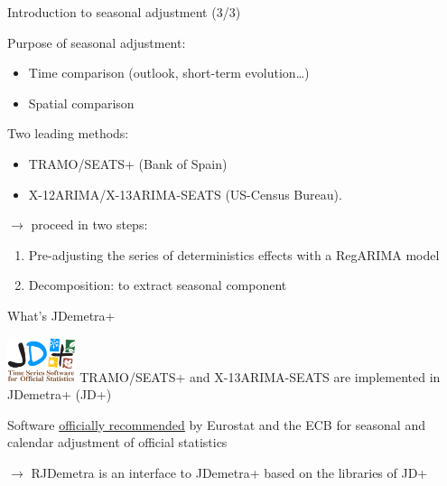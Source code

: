 \documentclass[10pt,xcolor=table,color={dvipsnames,usenames},ignorenonframetext,usepdftitle=false,french]{beamer}
\providecommand{\tightlist}{%
  \setlength{\parskip}{0pt}
  }
\begin{document}
\begin{frame}{Introduction to seasonal adjustment (3/3)}
\protect\hypertarget{introduction-to-seasonal-adjustment-33}{}

Purpose of seasonal adjustment:

\begin{itemize}
\tightlist
\item
  Time comparison (outlook, short-term evolution\ldots{})\\
\item
  Spatial comparison
\end{itemize}

\bigskip
\pause

Two leading methods:

\begin{itemize}
\tightlist
\item
  TRAMO/SEATS+ (Bank of Spain)\\
\item
  X-12ARIMA/X-13ARIMA-SEATS (US-Census Bureau).
\end{itemize}

\bigskip
\pause

\(\rightarrow\) proceed in two steps:

\begin{enumerate}
\item
  Pre-adjusting the series of deterministics effects with a RegARIMA
  model
\item
  Decomposition: to extract seasonal component
\end{enumerate}

\end{frame}

\begin{frame}{What's JDemetra+\bcquestion }
\protect\hypertarget{whats-jdemetra}{}

\includegraphics[width=2cm]{img/jdemetra+.png} TRAMO/SEATS+ and
X-13ARIMA-SEATS are implemented in JDemetra+ (JD+)

\bigskip

\large\faThumbsUp{} \normalsize Software
\href{https://ec.europa.eu/eurostat/cros/system/files/Jdemetra_\%20release.pdf}{officially
recommended} by Eurostat and the ECB for seasonal and calendar
adjustment of official statistics

\bigskip

\(\rightarrow\) RJDemetra is an \large\faRProject{}
\normalsize interface to JDemetra+ based on the \large\faJava{}
\normalsize libraries of JD+

\end{frame}
\end{document}
